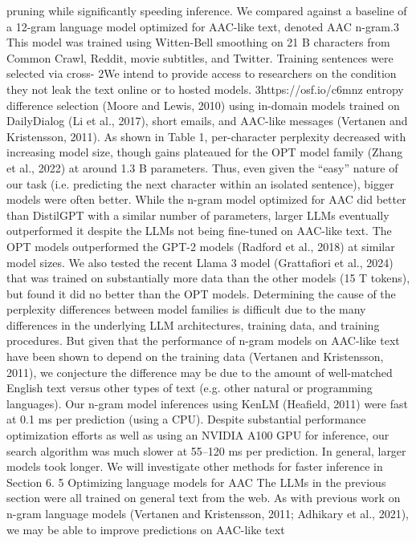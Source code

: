 pruning while significantly speeding inference.
We compared against a baseline of a 12-gram
language model optimized for AAC-like text, denoted AAC n-gram.3 This model was trained using
Witten-Bell smoothing on 21 B characters from
Common Crawl, Reddit, movie subtitles, and Twitter. Training sentences were selected via cross-
2We intend to provide access to researchers on the condition they not leak the text online or to hosted models.
3https://osf.io/c6mnz
entropy difference selection (Moore and Lewis,
2010) using in-domain models trained on DailyDialog (Li et al., 2017), short emails, and AAC-like
messages (Vertanen and Kristensson, 2011).
As shown in Table 1, per-character perplexity
decreased with increasing model size, though gains
plateaued for the OPT model family (Zhang et al.,
2022) at around 1.3 B parameters. Thus, even given
the “easy” nature of our task (i.e. predicting the
next character within an isolated sentence), bigger
models were often better. While the n-gram model
optimized for AAC did better than DistilGPT with
a similar number of parameters, larger LLMs eventually outperformed it despite the LLMs not being
fine-tuned on AAC-like text.
The OPT models outperformed the GPT-2 models (Radford et al., 2018) at similar model sizes. We
also tested the recent Llama 3 model (Grattafiori
et al., 2024) that was trained on substantially more
data than the other models (15 T tokens), but found
it did no better than the OPT models.
Determining the cause of the perplexity differences between model families is difficult due to the
many differences in the underlying LLM architectures, training data, and training procedures. But
given that the performance of n-gram models on
AAC-like text have been shown to depend on the
training data (Vertanen and Kristensson, 2011), we
conjecture the difference may be due to the amount
of well-matched English text versus other types of
text (e.g. other natural or programming languages).
Our n-gram model inferences using KenLM
(Heafield, 2011) were fast at 0.1 ms per prediction
(using a CPU). Despite substantial performance
optimization efforts as well as using an NVIDIA
A100 GPU for inference, our search algorithm was
much slower at 55–120 ms per prediction. In general, larger models took longer. We will investigate
other methods for faster inference in Section 6.
5 Optimizing language models for AAC
The LLMs in the previous section were all trained
on general text from the web. As with previous
work on n-gram language models (Vertanen and
Kristensson, 2011; Adhikary et al., 2021), we may
be able to improve predictions on AAC-like text
